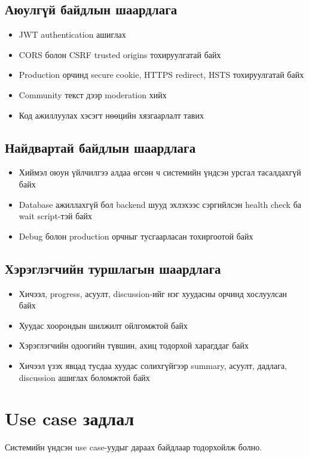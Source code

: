 \subsection{Аюулгүй байдлын шаардлага}
\begin{itemize}
\item JWT authentication ашиглах
\item CORS болон CSRF trusted origins тохируулгатай байх
\item Production орчинд secure cookie, HTTPS redirect, HSTS тохируулгатай байх
\item Community текст дээр moderation хийх
\item Код ажиллуулах хэсэгт нөөцийн хязгаарлалт тавих
\end{itemize}

\subsection{Найдвартай байдлын шаардлага}
\begin{itemize}
\item Хиймэл оюун үйлчилгээ алдаа өгсөн ч системийн үндсэн урсгал тасалдахгүй байх
\item Database ажиллахгүй бол backend шууд эхлэхээс сэргийлсэн health check ба wait script-тэй байх
\item Debug болон production орчныг тусгаарласан тохиргоотой байх
\end{itemize}

\subsection{Хэрэглэгчийн туршлагын шаардлага}
\begin{itemize}
\item Хичээл, progress, асуулт, discussion-ийг нэг хуудасны орчинд хослуулсан байх
\item Хуудас хоорондын шилжилт ойлгомжтой байх
\item Хэрэглэгчийн одоогийн түвшин, ахиц тодорхой харагддаг байх
\item Хичээл үзэх явцад тусдаа хуудас солихгүйгээр summary, асуулт, дадлага, discussion ашиглах боломжтой байх
\end{itemize}

\section{Use case задлал}
Системийн үндсэн use case-уудыг дараах байдлаар тодорхойлж болно.

